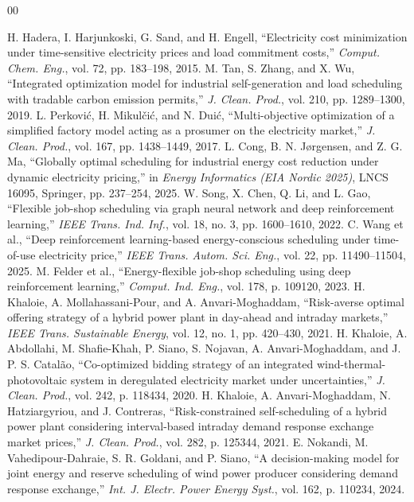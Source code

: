 \documentclass[journal]{IEEEtran}
\begin{document}
\begin{thebibliography}{00}


 H. Hadera, I. Harjunkoski, G. Sand, and H. Engell, ``Electricity cost minimization under time-sensitive electricity prices and load commitment costs,'' \emph{Comput. Chem. Eng.}, vol. 72, pp. 183--198, 2015.
 M. Tan, S. Zhang, and X. Wu, ``Integrated optimization model for industrial self-generation and load scheduling with tradable carbon emission permits,'' \emph{J. Clean. Prod.}, vol. 210, pp. 1289--1300, 2019.
 L. Perkovi{\'c}, H. Mikul{\v{c}}i{\'c}, and N. Dui{\'c}, ``Multi-objective optimization of a simplified factory model acting as a prosumer on the electricity market,'' \emph{J. Clean. Prod.}, vol. 167, pp. 1438--1449, 2017.
 L. Cong, B. N. J{\o}rgensen, and Z. G. Ma, ``Globally optimal scheduling for industrial energy cost reduction under dynamic electricity pricing,'' in \emph{Energy Informatics (EIA Nordic 2025)}, LNCS 16095, Springer, pp. 237--254, 2025.
 W. Song, X. Chen, Q. Li, and L. Gao, ``Flexible job-shop scheduling via graph neural network and deep reinforcement learning,'' \emph{IEEE Trans. Ind. Inf.}, vol. 18, no. 3, pp. 1600--1610, 2022.
 C. Wang et al., ``Deep reinforcement learning-based energy-conscious scheduling under time-of-use electricity price,'' \emph{IEEE Trans. Autom. Sci. Eng.}, vol. 22, pp. 11490--11504, 2025.
 M. Felder et al., ``Energy-flexible job-shop scheduling using deep reinforcement learning,'' \emph{Comput. Ind. Eng.}, vol. 178, p. 109120, 2023.
 H. Khaloie, A. Mollahassani-Pour, and A. Anvari-Moghaddam, ``Risk-averse optimal offering strategy of a hybrid power plant in day-ahead and intraday markets,'' \emph{IEEE Trans. Sustainable Energy}, vol. 12, no. 1, pp. 420--430, 2021.
 H. Khaloie, A. Abdollahi, M. Shafie-Khah, P. Siano, S. Nojavan, A. Anvari-Moghaddam, and J. P. S. Catal{\~a}o, ``Co-optimized bidding strategy of an integrated wind-thermal-photovoltaic system in deregulated electricity market under uncertainties,'' \emph{J. Clean. Prod.}, vol. 242, p. 118434, 2020.
 H. Khaloie, A. Anvari-Moghaddam, N. Hatziargyriou, and J. Contreras, ``Risk-constrained self-scheduling of a hybrid power plant considering interval-based intraday demand response exchange market prices,'' \emph{J. Clean. Prod.}, vol. 282, p. 125344, 2021.
 E. Nokandi, M. Vahedipour-Dahraie, S. R. Goldani, and P. Siano, ``A decision-making model for joint energy and reserve scheduling of wind power producer considering demand response exchange,'' \emph{Int. J. Electr. Power Energy Syst.}, vol. 162, p. 110234, 2024.

\end{thebibliography}
\end{document}
